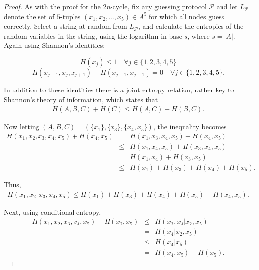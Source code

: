\begin{proof}
 As with the proof for the $2n$-cycle, fix any guessing protocol $\mathcal{P}$ and let $L_\mathcal{P}$ denote the set of $5$-tuples $(x_1, x_2, \dots, x_5 ) \in A^5$ for which all nodes guess correctly. Select a string at random from $L_\mathcal{P}$, and calculate the entropies of the random variables in the string, using the logarithm in base $s$, where $s = |A|$. Again using Shannon's identities:
 
\[H(x_j) \leq 1 \quad \forall j \in \{1, 2, 3, 4, 5\} \]
\[H(x_{j - 1}, x_{j}, x_{j + 1}) - H(x_{j - 1}, x_{j + 1}) = 0 \quad \forall j \in \{1, 2, 3, 4, 5\}. \]

In addition to these identities there is a joint entropy relation, rather key to Shannon's theory of information, which states that
\begin{eqnarray}
 H(A, B, C) + H(C) \leq H(A, C) + H(B, C) \label{eqn:shannon}.
\end{eqnarray}

Now letting $(A, B, C) = ( \{ x_1 \}, \{ x_3 \}, \{ x_4, x_5 \} )$, the inequality becomes
\begin{eqnarray*}
 H(x_1, x_2, x_3, x_4, x_5) + H(x_4, x_5) & = & H(x_1, x_3, x_4, x_5) + H(x_4, x_5) \\
                                          & \leq & H(x_1, x_4, x_5) + H(x_3, x_4, x_5) \\
                                          & = & H(x_1, x_4) + H(x_3, x_5) \\
                                          & \leq & H(x_1) + H(x_3) + H(x_4) + H(x_5).
\end{eqnarray*}

Thus,
\begin{eqnarray}
 H(x_1, x_2, x_3, x_4, x_5) \leq H(x_1) + H(x_3) + H(x_4) + H(x_5) - H(x_4, x_5) \label{eqn:ineq1}.
\end{eqnarray}

Next, using conditional entropy,
\begin{eqnarray*}
 H(x_1, x_2, x_3, x_4, x_5) - H(x_2, x_5) & \leq & H(x_3, x_4 | x_2, x_5) \\
                                          & = & H(x_4 | x_2, x_5) \\
                                          & \leq & H(x_4|x_5) \\
                                          & = & H(x_4, x_5) - H(x_5).
\end{eqnarray*}


\end{proof}
